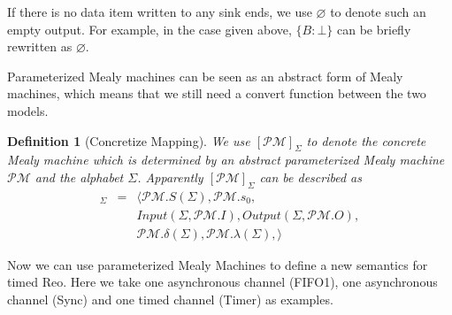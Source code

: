 \documentclass[conference, a4paper]{IEEEtran}
\newtheorem{definition}{Definition}
\newcommand{\smap}[1]{[{#1}]}
\begin{document}
If there is no data item written to any sink ends, we use $\varnothing$ to denote such an empty
output. For example, in the case given above, $\{B:\bot\}$ can be briefly rewritten as $\varnothing$.

Parameterized Mealy machines can be seen as an abstract form of Mealy machines, which means that we
still need a convert function between the two models.

\begin{definition}[Concretize Mapping]
  We use $\smap{\mathcal{PM}}_{\Sigma}$ to denote the concrete Mealy machine which is determined by
  an abstract parameterized Mealy machine $\mathcal{PM}$ and the alphabet $\Sigma$. Apparently
  $\smap{\mathcal{PM}}_{\Sigma}$ can be described as
  \begin{eqnarray*}
    \smap{\mathcal{PM}}_{\Sigma} &=& 
    \langle
    \mathcal{PM}.S(\Sigma), \mathcal{PM}.s_0, \\
    & & Input(\Sigma, \mathcal{PM}.I), Output(\Sigma, \mathcal{PM}.O), \\
    & & \mathcal{PM}.\delta(\Sigma), \mathcal{PM}.\lambda(\Sigma),
    \rangle
  \end{eqnarray*}
\end{definition}

Now we can use parameterized Mealy Machines to define a new semantics for timed Reo. Here we
take one asynchronous channel (FIFO1), one asynchronous channel (Sync) and one timed channel (Timer)
as examples.
\end{document}
